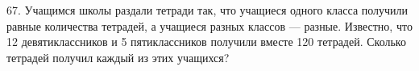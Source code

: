 67. Учащимся школы раздали тетради так, что учащиеся одного класса получили равные количества тетрадей, а учащиеся разных классов --- разные. Известно, что 12 девятиклассников и 5 пятиклассников получили вместе 120 тетрадей. Сколько тетрадей получил каждый из этих учащихся?\\
